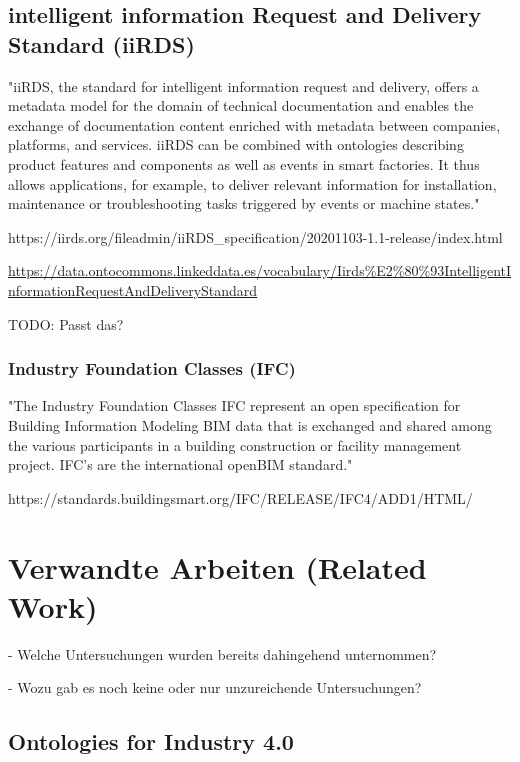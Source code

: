 \documentclass{article}
\begin{document}
\subsection{intelligent information Request and Delivery Standard (iiRDS)}

"iiRDS, the standard for intelligent information request and delivery, offers a metadata model for the domain of technical documentation and enables the exchange of documentation content enriched with metadata between companies, platforms, and services. iiRDS can be combined with ontologies describing product features and components as well as events in smart factories. It thus allows applications, for example, to deliver relevant information for installation, maintenance or troubleshooting tasks triggered by events or machine states."

https://iirds.org/fileadmin/iiRDS\_specification/20201103-1.1-release/index.html

\url{https://data.ontocommons.linkeddata.es/vocabulary/Iirds%E2%80%93IntelligentInformationRequestAndDeliveryStandard}

TODO: Passt das?

\subsubsection{Industry Foundation Classes (IFC)}

"The Industry Foundation Classes IFC represent an open specification for Building Information Modeling BIM data that is exchanged and shared among the various participants in a building construction or facility management project. IFC's are the international openBIM standard."

https://standards.buildingsmart.org/IFC/RELEASE/IFC4/ADD1/HTML/

\section{Verwandte Arbeiten (Related Work)}

- Welche Untersuchungen wurden bereits dahingehend unternommen?

- Wozu gab es noch keine oder nur unzureichende Untersuchungen?

\subsection{Ontologies for Industry 4.0}
%
\end{document}
